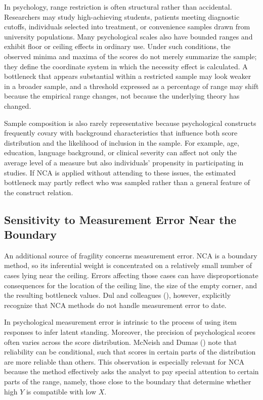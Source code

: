 \documentclass[
  man,
  longtable,
  nolmodern,
  notxfonts,
  notimes,
  colorlinks=true,linkcolor=blue,citecolor=blue,urlcolor=blue]{apa7}
\begin{document}
In psychology, range restriction is often structural rather than
accidental. Researchers may study high-achieving students, patients
meeting diagnostic cutoffs, individuals selected into treatment, or
convenience samples drawn from university populations. Many
psychological scales also have bounded ranges and exhibit floor or
ceiling effects in ordinary use. Under such conditions, the observed
minima and maxima of the scores do not merely summarize the sample; they
define the coordinate system in which the necessity effect is
calculated. A bottleneck that appears substantial within a restricted
sample may look weaker in a broader sample, and a threshold expressed as
a percentage of range may shift because the empirical range changes, not
because the underlying theory has changed.

Sample composition is also rarely representative because psychological
constructs frequently covary with background characteristics that
influence both score distribution and the likelihood of inclusion in the
sample. For example, age, education, language background, or clinical
severity can affect not only the average level of a measure but also
individuals' propensity in participating in studies. If NCA is applied
without attending to these issues, the estimated bottleneck may partly
reflect who was sampled rather than a general feature of the construct
relation.

\subsection{Sensitivity to Measurement Error Near the
Boundary}\label{sensitivity-to-measurement-error-near-the-boundary}

An additional source of fragility concerns measurement error. NCA is a
boundary method, so its inferential weight is concentrated on a
relatively small number of cases lying near the ceiling. Errors
affecting those cases can have disproportionate consequences for the
location of the ceiling line, the size of the empty corner, and the
resulting bottleneck values. Dul and colleagues
(), however,
explicitly recognize that NCA methods do not handle measurement error to
date.

In psychological measurement error is intrinsic to the process of using
item responses to infer latent standing. Moreover, the precision of
psychological scores often varies across the score distribution. McNeish
and Dumas
() note
that reliability can be conditional, such that scores in certain parts
of the distribution are more reliable than others. This observation is
especially relevant for NCA because the method effectively asks the
analyst to pay special attention to certain parts of the range, namely,
those close to the boundary that determine whether high \(Y\) is
compatible with low \(X\).
\end{document}
